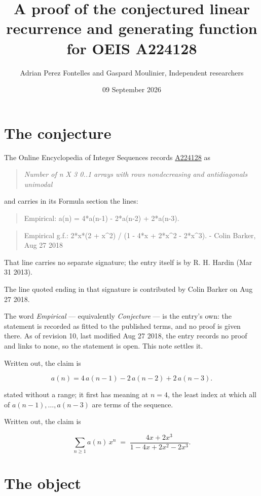 \documentclass[11pt]{article}
\title{A proof of the conjectured linear recurrence and generating function for OEIS A224128}
\author{Adrian Perez Fontelles and Gaspard Moulinier, Independent researchers}
\date{09 September 2026}
\theoremstyle{definition}
\begin{document}
\maketitle
\section{The conjecture}

The Online Encyclopedia of Integer Sequences records \href{https://oeis.org/A224128}{A224128} as

\begin{quote}\itshape Number of n X 3 0..1 arrays with rows nondecreasing and antidiagonals unimodal\end{quote}

and carries in its Formula section the lines:

\begin{quote}\ttfamily Empirical: a(n) = 4*a(n-1) - 2*a(n-2) + 2*a(n-3).\end{quote}

\begin{quote}\ttfamily Empirical g.f.: 2*x*(2 + x\textasciicircum{}2) / (1 - 4*x + 2*x\textasciicircum{}2 - 2*x\textasciicircum{}3). - Colin Barker, Aug 27 2018\end{quote}

That line carries no separate signature; the entry itself is by R. H. Hardin (Mar 31 2013).

The line quoted ending in that signature is contributed by Colin Barker on Aug 27 2018.

The word {\itshape Empirical} --- equivalently {\itshape Conjecture} --- is the entry's own: the statement is recorded as fitted to the published terms, and no proof is given there. As of revision 10, last modified Aug 27 2018, the entry records no proof and links to none, so the statement is open. This note settles it.

Written out, the claim is

\[a(n) = 4\,a(n-1) - 2\,a(n-2) + 2\,a(n-3).\]

stated without a range; it first has meaning at $n = 4$, the least index at which all of $a(n-1),\dots,a(n-3)$ are terms of the sequence.

Written out, the claim is

\[\sum_{n \ge 1} a(n)\,x^n \;=\; \frac{4x + 2x^{3}}{1 - 4x + 2x^{2} - 2x^{3}}.\]

\section{The object}
\end{document}
